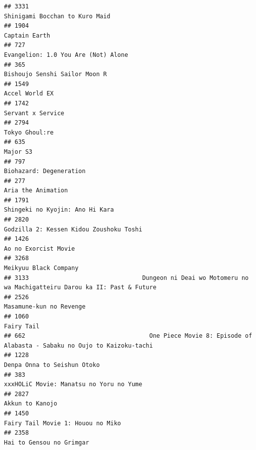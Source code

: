 \documentclass[
]{article}
\begin{document}
\begin{verbatim}
## 3331                                                                            Shinigami Bocchan to Kuro Maid
## 1904                                                                                             Captain Earth
## 727                                                                        Evangelion: 1.0 You Are (Not) Alone
## 365                                                                              Bishoujo Senshi Sailor Moon R
## 1549                                                                                            Accel World EX
## 1742                                                                                         Servant x Service
## 2794                                                                                            Tokyo Ghoul:re
## 635                                                                                                   Major S3
## 797                                                                                    Biohazard: Degeneration
## 277                                                                                         Aria the Animation
## 1791                                                                           Shingeki no Kyojin: Ano Hi Kara
## 2820                                                                   Godzilla 2: Kessen Kidou Zoushoku Toshi
## 1426                                                                                      Ao no Exorcist Movie
## 3268                                                                                     Meikyuu Black Company
## 3133                                Dungeon ni Deai wo Motomeru no wa Machigatteiru Darou ka II: Past & Future
## 2526                                                                                   Masamune-kun no Revenge
## 1060                                                                                                Fairy Tail
## 662                                   One Piece Movie 8: Episode of Alabasta - Sabaku no Oujo to Kaizoku-tachi
## 1228                                                                               Denpa Onna to Seishun Otoko
## 383                                                                    xxxHOLiC Movie: Manatsu no Yoru no Yume
## 2827                                                                                           Akkun to Kanojo
## 1450                                                                         Fairy Tail Movie 1: Houou no Miko
## 2358                                                                                  Hai to Gensou no Grimgar

\end{verbatim}
\end{document}
